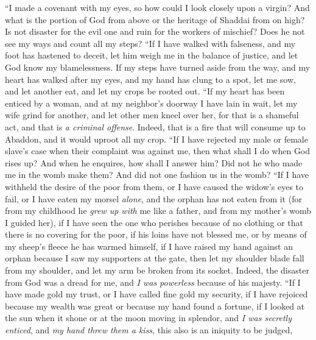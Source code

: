 \begin{biblechapter} %
 “I made a covenant with my eyes, 
so how could I look closely upon a virgin?
\verse And what is the portion of God from above 
or the heritage of Shaddai from on high?
\verse Is not disaster for the evil one 
and ruin for the workers of mischief?
\verse Does he not see my ways 
and count all my steps?
\verse “If I have walked with falseness, 
and my foot has hastened to deceit,
\verse let him weigh me in the balance of justice, 
and let God know my blamelessness.
\verse If my steps have turned aside from the way, 
and my heart has walked after my eyes, 
and my hand has clung to a spot,
\verse let me sow, and let another eat, 
and let my crops be rooted out.
\verse “If my heart has been enticed by a woman, 
and at my neighbor’s doorway I have lain in wait,
\verse let my wife grind for another, 
and let other men kneel over her,
\verse for that is a shameful act, 
and that is \textit{a criminal offense}.
\verse Indeed, that is a fire that will consume up to Abaddon, 
and it would uproot all my crop.
\verse “If I have rejected my male or female slave’s case 
when their complaint was against me,
\verse then what shall I do when God rises up? 
And when he enquires, how shall I answer him?
\verse Did not he who made me in the womb make them? 
And did not one fashion us in the womb?
\verse “If I have withheld the desire of the poor from them, 
or I have caused the widow’s eyes to fail,
\verse or I have eaten my morsel \textit{alone}, 
and the orphan has not eaten from it
\verse (for from my childhood he \textit{grew up with} me like a father, 
and from my mother’s womb I guided her),
\verse if I have seen the one who perishes because of no clothing 
or that there is no covering for the poor,
\verse if his loins have not blessed me, 
or by means of my sheep’s fleece he has warmed himself,
\verse if I have raised my hand against an orphan 
because I saw my supporters at the gate,
\verse then let my shoulder blade fall from my shoulder, 
and let my arm be broken from its socket.
\verse Indeed, the disaster from God was a dread for me, 
and \textit{I was powerless} because of his majesty.
\verse “If I have made gold my trust, 
or I have called fine gold my security,
\verse if I have rejoiced because my wealth was great 
or because my hand found a fortune,
\verse if I looked at the sun when it shone 
or at the moon moving in splendor,
\verse and \textit{I was secretly enticed}, 
and \textit{my hand threw them a kiss},
\verse this also is an iniquity to be judged, 

\end{biblechapter}
